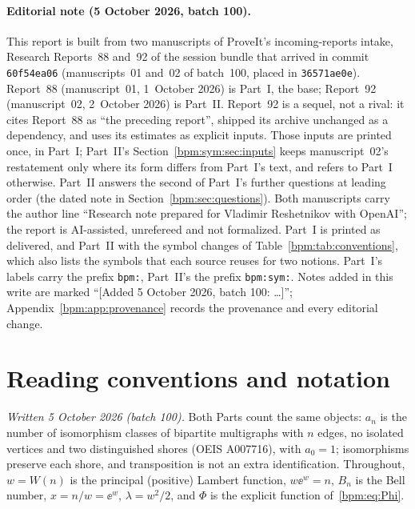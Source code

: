 \documentclass[11pt,a4paper]{article}
\theoremstyle{remark}\newtheorem{remark}[theorem]{Remark}%
\begin{document}
\paragraph{Editorial note (5 October 2026, batch 100).}
This report is built from two manuscripts of ProveIt's incoming-reports
intake, Research Reports~88 and~92 of the session bundle that arrived in
commit \texttt{60f54ea06} (manuscripts~01 and~02 of batch~100, placed in
\texttt{36571ae0e}). Report~88 (manuscript~01, 1~October 2026) is Part~I,
the base; Report~92 (manuscript~02, 2~October 2026) is Part~II. Report~92
is a sequel, not a rival: it cites Report~88 as ``the preceding report'',
shipped its archive unchanged as a dependency, and uses its estimates as
explicit inputs. Those inputs are printed once, in Part~I; Part~II's
Section~\ref{bpm:sym:sec:inputs} keeps manuscript~02's restatement only
where its form differs from Part~I's text, and refers to Part~I otherwise.
Part~II answers the second of Part~I's further questions at leading order
(the dated note in Section~\ref{bpm:sec:questions}). Both manuscripts carry
the author line ``Research note prepared for Vladimir Reshetnikov with
OpenAI''; the report is AI-assisted, unrefereed and not formalized. Part~I
is printed as delivered, and Part~II with the symbol changes of
Table~\ref{bpm:tab:conventions}, which also lists the symbols that each
source reuses for two notions. Part~I's labels carry the prefix
\texttt{bpm:}, Part~II's the prefix \texttt{bpm:sym:}. Notes added in this
write are marked ``[Added 5 October 2026, batch 100: \dots]'';
Appendix~\ref{bpm:app:provenance} records the provenance and every
editorial change.

\tableofcontents

\section*{Reading conventions and notation}\label{bpm:sec:conventions}
\textit{Written 5 October 2026 (batch 100).}
Both Parts count the same objects: $a_n$ is the number of isomorphism
classes of bipartite multigraphs with $n$ edges, no isolated vertices and
two distinguished shores (OEIS A007716), with $a_0=1$; isomorphisms preserve
each shore, and transposition is not an extra identification. Throughout,
$w=W(n)$ is the principal (positive) Lambert function, $w\ee^w=n$, $B_n$ is
the Bell number, $x=n/w=\ee^w$, $\lambda=w^2/2$, and $\Phi$ is the explicit
function of~\eqref{bpm:eq:Phi}.
\end{document}
